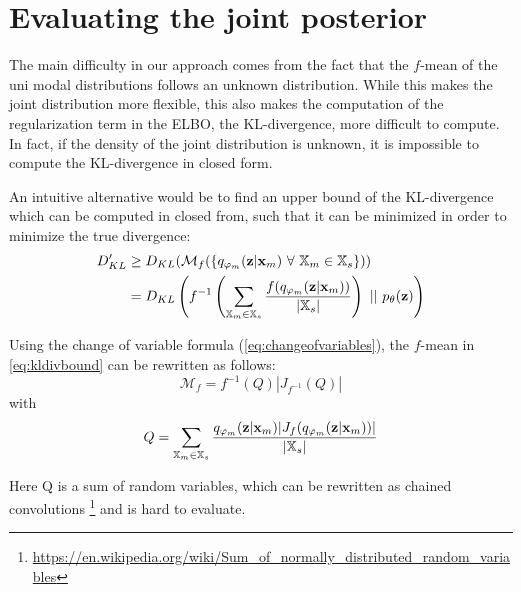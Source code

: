 
\section{Evaluating the joint posterior}
The main difficulty in our approach comes from the fact that the $f$-mean of the uni modal distributions follows an unknown distribution.
While this makes the joint distribution more flexible, this also makes the computation of the regularization term in the ELBO, the KL-divergence, more difficult to compute.
In fact, if the density of the joint distribution is unknown, it is impossible to compute the KL-divergence in closed form.

An intuitive alternative would be to find an upper bound of the KL-divergence which can be computed in closed from, such that it can be minimized in order to minimize the true divergence:
\begin{equation}
    \label{eq:kldivbound}
    \begin{split}
    D_{KL}^{\prime} &\geq D_{KL}(\mathcal{M}_f(\{\unimodalpost\ \forall\ \xsetm \in \xsubset\}))\\
    &=  D_{KL}\left(f^{-1}\left(\sum _{\xsetm \in \xsubset} \frac{f(\unimodalpost)}{|\xsubset|}\right)\ ||\ \prior\right)
    \end{split}
\end{equation}

Using the change of variable formula (\cref{eq:changeofvariables}), the $f$-mean in \cref{eq:kldivbound} can be rewritten as follows:
\begin{equation}
    \mathcal{M}_f = f^{-1}(Q)|J_{f^{-1}}(Q)|
\end{equation}
with
\begin{equation}
    Q= \sum _{\mathbb{X}_m \in \mathbb{X}_s} \frac{q_{\varphi_m}(\textbf{z}|\textbf{x}_m)|J_f(q_{\varphi_m}(\textbf{z}|\textbf{x}_m))|}{|\mathbb{X}_s|}
\end{equation}

Here Q is a sum of random variables, which can be rewritten as chained convolutions \footnote{\url{https://en.wikipedia.org/wiki/Sum_of_normally_distributed_random_variables}} and is hard to evaluate.

